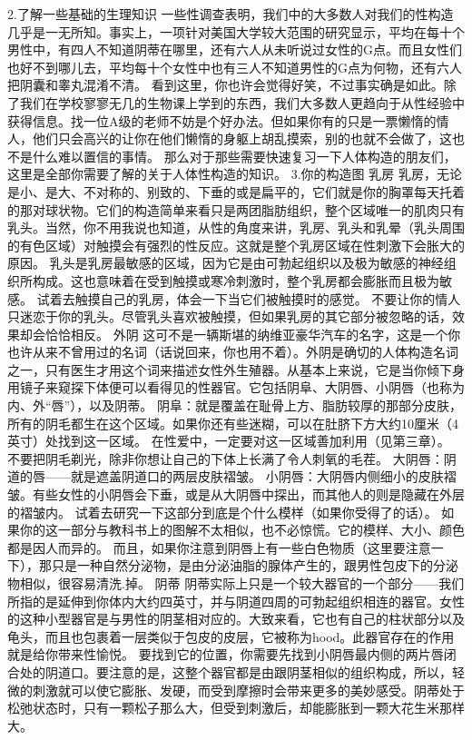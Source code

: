 \documentclass[12pt,UTF8]{ctexbook}
\begin{document}
2.了解一些基础的生理知识
一些性调查表明，我们中的大多数人对我们的性构造几乎是一无所知。事实上，一项针对美国大学较大范围的研究显示，平均在每十个男性中，有四人不知道阴蒂在哪里，还有六人从未听说过女性的G点。而且女性们也好不到哪儿去，平均每十个女性中也有三人不知道男性的G点为何物，还有六人把阴囊和睾丸混淆不清。
看到这里，你也许会觉得好笑，不过事实确是如此。除了我们在学校寥寥无几的生物课上学到的东西，我们大多数人更趋向于从性经验中获得信息。找一位A级的老师不妨是个好办法。但如果你有的只是一票懒惰的情人，他们只会高兴的让你在他们懒惰的身躯上胡乱摸索，别的也就不会做了，这也不是什么难以置信的事情。
那么对于那些需要快速复习一下人体构造的朋友们，这里是全部你需要了解的关于人体性构造的知识。
3.你的构造图
乳房
乳房，无论是小、是大、不对称的、别致的、下垂的或是扁平的，它们就是你的胸罩每天托着的那对球状物。它们的构造简单来看只是两团脂肪组织，整个区域唯一的肌肉只有乳头。当然，你不用我说也知道，从性的角度来讲，乳房、乳头和乳晕（乳头周围的有色区域）对触摸会有强烈的性反应。这就是整个乳房区域在性刺激下会胀大的原因。
乳头是乳房最敏感的区域，因为它是由可勃起组织以及极为敏感的神经组织所构成。这也意味着在受到触摸或寒冷刺激时，整个乳房都会膨胀而且极为敏感。
试着去触摸自己的乳房，体会一下当它们被触摸时的感觉。
不要让你的情人只迷恋于你的乳头。尽管乳头喜欢被触摸，但如果乳房的其它部分被忽略的话，效果却会恰恰相反。
外阴
这可不是一辆斯堪的纳维亚豪华汽车的名字，这是一个你也许从来不曾用过的名词（话说回来，你也用不着）。外阴是确切的人体构造名词之一，只有医生才用这个词来描述女性外生殖器。从基本上来说，它是当你倾下身用镜子来窥探下体便可以看得见的性器官。它包括阴阜、大阴唇、小阴唇（也称为内、外“唇”），以及阴蒂。
阴阜：就是覆盖在耻骨上方、脂肪较厚的那部分皮肤，所有的阴毛都生在这个区域。如果你还有些迷糊，可以在肚脐下方大约10厘米（4英寸）处找到这一区域。
在性爱中，一定要对这一区域善加利用（见第三章）。
不要把阴毛剃光，除非你想让自己的下体上长满了令人刺氧的毛茬。
大阴唇：阴道的唇——就是遮盖阴道口的两层皮肤褶皱。
小阴唇：大阴唇内侧细小的皮肤褶皱。有些女性的小阴唇会下垂，或是从大阴唇中探出，而其他人的则是隐藏在外层的褶皱内。
试着去研究一下这部分到底是个什么模样（如果你受得了的话）。
如果你的这一部分与教科书上的图解不太相似，也不必惊慌。它的模样、大小、颜色都是因人而异的。
而且，如果你注意到阴唇上有一些白色物质（这里要注意一下），那只是一种自然分泌物，是由分泌油脂的腺体产生的，跟男性包皮下的分泌物相似，很容易清洗.掉。
阴蒂
阴蒂实际上只是一个较大器官的一个部分——我们所指的是延伸到你体内大约四英寸，并与阴道四周的可勃起组织相连的器官。女性的这种小型器官是与男性的阴茎相对应的。大致来看，它也有自己的柱状部分以及龟头，而且也包裹着一层类似于包皮的皮层，它被称为hood。此器官存在的作用就是给你带来性愉悦。
要找到它的位置，你需要先找到小阴唇最内侧的两片唇闭合处的阴道口。要注意的是，这整个器官都是由跟阴茎相似的组织构成，所以，轻微的刺激就可以使它膨胀、发硬，而受到摩擦时会带来更多的美妙感受。阴蒂处于松弛状态时，只有一颗松子那么大，但受到刺激后，却能膨胀到一颗大花生米那样大。
\end{document}
